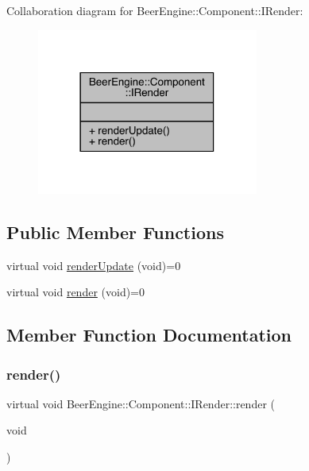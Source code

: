 Collaboration diagram for Beer\+Engine\+:\+:Component\+:\+:I\+Render\+:\nopagebreak
\begin{figure}[H]
\begin{center}
\leavevmode
\includegraphics[width=206pt]{class_beer_engine_1_1_component_1_1_i_render__coll__graph}
\end{center}
\end{figure}
\subsection*{Public Member Functions}
\begin{DoxyCompactItemize}
\item 
virtual void \mbox{\hyperlink{class_beer_engine_1_1_component_1_1_i_render_aef1ff4ddcdf216d290c747edd86bd99e}{render\+Update}} (void)=0
\item 
virtual void \mbox{\hyperlink{class_beer_engine_1_1_component_1_1_i_render_a021864acc1288b34b13f8766735ebcc0}{render}} (void)=0
\end{DoxyCompactItemize}


\subsection{Member Function Documentation}
\mbox{\label{class_beer_engine_1_1_component_1_1_i_render_a021864acc1288b34b13f8766735ebcc0}} 
\subsubsection{\texorpdfstring{render()}{render()}}
{\footnotesize\ttfamily virtual void Beer\+Engine\+::\+Component\+::\+I\+Render\+::render (\begin{DoxyParamCaption}\item[{void}]{ }\end{DoxyParamCaption})\hspace{0.3cm}{\ttfamily [pure virtual]}}



